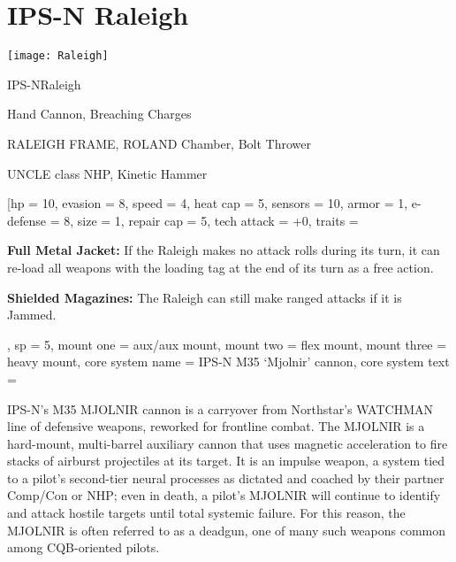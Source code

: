 \section{IPS-N Raleigh}

\begin{center}
    \texttt{[image: Raleigh]}
\end{center}

\begin{mech}{IPS-N}{Raleigh}


\begin{license}
\item Hand Cannon, Breaching Charges
\item RALEIGH FRAME, ROLAND Chamber, Bolt Thrower
\item UNCLE class NHP, Kinetic Hammer
\end{license}

\frameBox
[hp = 10,
evasion = 8,
speed = 4,
heat cap = 5,
sensors = 10,
armor = 1,
e-defense = 8,
size = 1,
repair cap = 5,
tech attack = +0,
traits = {\textbf{Full Metal Jacket:} If the Raleigh makes no attack rolls during its turn, it can re-load all weapons with the loading tag at the end of its turn as a free action.

\textbf{Shielded Magazines:} The Raleigh can still make ranged attacks if it is Jammed.},
sp = 5,
mount one = aux/aux mount,
mount two = flex mount,
mount three = heavy mount,
core system name = IPS-N M35 ‘Mjolnir’ cannon,
core system text = {IPS-N’s M35 MJOLNIR cannon is a carryover from Northstar’s WATCHMAN line of defensive weapons, reworked for frontline combat. The MJOLNIR is a hard-mount, multi-barrel auxiliary cannon that uses magnetic acceleration to fire stacks of airburst projectiles at its target. It is an impulse weapon, a system tied to a pilot’s second-tier neural processes as dictated and coached by their partner Comp/Con or NHP; even in death, a pilot’s MJOLNIR will continue to identify and attack hostile targets until total systemic failure. For this reason, the MJOLNIR is often referred to as a deadgun, one of many such weapons common among CQB-oriented pilots.

}
\end{mech}
